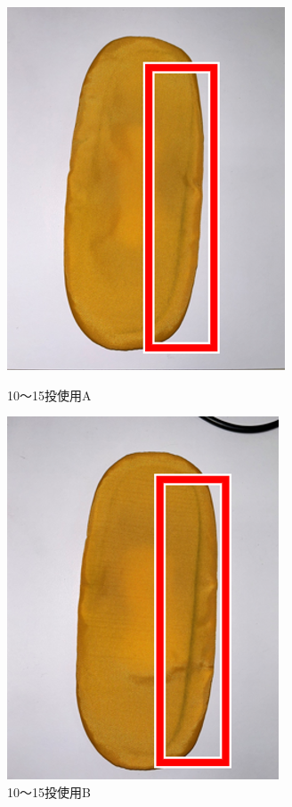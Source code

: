 \documentclass[main]{subfiles}
\begin{document}
\begin{figure}[htbp]
    \centering
    \begin{minipage}[htbp]{0.3\linewidth}
        \centering
        \includegraphics[keepaspectratio, width=0.8\linewidth, height=\linewidth]{figures/caring_brush_pad/10~15Akousatu.png}
        \caption{10～15投使用A}
        \label{fig:label}
    \end{minipage}
    \begin{minipage}[htbp]{0.3\linewidth}
        \centering
        \includegraphics[keepaspectratio, width=0.8\linewidth, height=\linewidth]{figures/caring_brush_pad/10~15Bkousatu.png}
        \caption{10～15投使用B}
        \label{fig:label}
    \end{minipage}
\end{figure}
\end{document}
